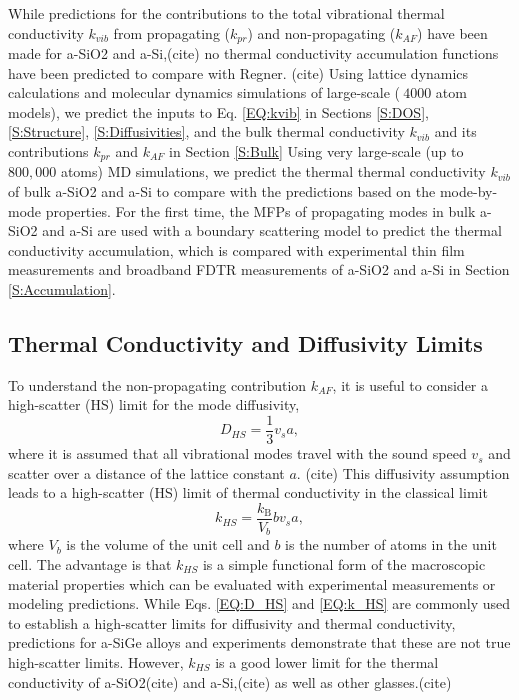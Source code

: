 \documentclass[aps,prb,twocolumn,superscriptaddress,footinbib,amsmath,amssymb,floatfix]{revtex4}
\begin{document}
While predictions for the contributions to the total 
vibrational thermal conductivity $k_{vib}$ from 
propagating ($k_{pr}$) and non-propagating ($k_{AF}$) have 
been made for a-SiO2 and a-Si,(cite) no thermal conductivity 
accumulation functions have been predicted to compare with Regner.
(cite) 
Using lattice dynamics calculations and molecular dynamics simulations 
of large-scale ($~4000$ atom models), 
we predict the inputs to Eq. \eqref{EQ:kvib} in Sections \ref{S:DOS}, 
\ref{S:Structure}, \ref{S:Diffusivities}, and the bulk thermal 
conductivity 
$k_{vib}$ and its contributions $k_{pr}$ and $k_{AF}$ in Section 
\ref{S:Bulk} 
Using very large-scale (up to $800,000$ atoms) 
MD simulations, we predict the thermal 
thermal conductivity $k_{vib}$ of bulk a-SiO2 and a-Si to compare with 
the predictions based on the mode-by-mode properties. 
For the first time, the MFPs of propagating modes in bulk 
a-SiO2 and a-Si are used with a boundary scattering model 
to predict the thermal conductivity accumulation, which is 
compared with experimental thin film measurements and broadband 
FDTR measurements of a-SiO2 and a-Si in Section \ref{S:Accumulation}.

\subsection{\label{S:Limits}Thermal Conductivity and Diffusivity Limits}

To understand the non-propagating contribution $k_{AF}$, it is useful 
to consider a high-scatter (HS) limit for the mode diffusivity,
\begin{equation}\label{EQ:D_HS}
D_{HS} = \frac{1}{3} v_s a,
\end{equation}
where it is assumed that all vibrational modes travel with the sound speed  
$v_s$ and scatter over a distance of the lattice constant $a$.
(cite) 
This diffusivity assumption leads to a high-scatter (HS) limit of 
thermal conductivity in the classical limit\cite{cahill_lattice_1988} 
\begin{equation}\label{EQ:k_HS}
k_{HS} = \frac{k_{\text{B}}}{V_b}b v_s a,
\end{equation}
where $V_b$ is the volume of the unit cell and $b$ is the number of atoms 
in the unit cell.\cite{cahill_lower_1992} 
The advantage is that $k_{HS}$ is a simple 
functional form of the macroscopic material properties which can 
be evaluated with experimental measurements or modeling predictions. 
While Eqs. \eqref{EQ:D_HS} and \eqref{EQ:k_HS} are commonly used to 
establish a high-scatter limits for 
diffusivity and thermal conductivity, predictions for a-SiGe alloys 
\cite{feldman_thermal_1993} and experiments 
demonstrate that these are not true high-scatter limits.  
However, $k_{HS}$ is a good lower limit for the thermal conductivity 
of a-SiO2(cite) 
and a-Si,(cite) 
as well as other glasses.(cite)
\end{document}
